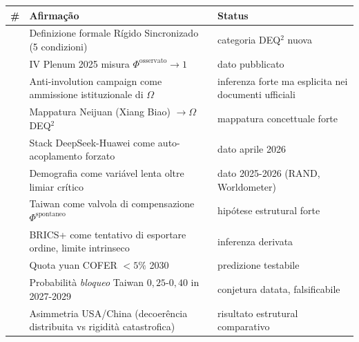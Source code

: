 {\def\LTcaptype{none} %
{\small\begin{longtable}[]{@{}
  >{\raggedright\arraybackslash}p{}
  >{\raggedright\arraybackslash}p{}
  >{\raggedright\arraybackslash}p{}@{}}
\toprule\noalign{}
\begin{minipage}[b]{\linewidth}\raggedright
\#
\end{minipage} & \begin{minipage}[b]{\linewidth}\raggedright
Afirmação
\end{minipage} & \begin{minipage}[b]{\linewidth}\raggedright
Status
\end{minipage} \\
\midrule\noalign{}
\endhead
\bottomrule\noalign{}
\endlastfoot
1 & Definizione formale Rígido Sincronizado (5 condizioni) & \Hypoth{}
categoria DEQ$^2$ nuova \\
2 & IV Plenum 2025 misura \(\Phi^{\text{osservato}} \to 1\) & \Proved{}
dato pubblicato \\
3 & Anti-involution campaign come ammissione istituzionale di \(\Omega\)
& \Hypoth{} inferenza forte ma esplicita nei documenti ufficiali \\
4 & Mappatura Neijuan (Xiang Biao) \(\to \Omega\) DEQ$^2$ & \Hypoth{}
mappatura concettuale forte \\
5 & Stack DeepSeek-Huawei come auto-acoplamento forzato & \Proved{}
dato aprile 2026 \\
6 & Demografia come variável lenta oltre limiar crítico & \Proved{}
dato 2025-2026 (RAND, Worldometer) \\
7 & Taiwan come valvola di compensazione \(\Phi^{\text{spontaneo}}\) &
\Conj{} hipótese estrutural forte \\
8 & BRICS+ come tentativo di esportare ordine, limite intrinseco &
\Hypoth{} inferenza derivata \\
9 & Quota yuan COFER \(< 5\%\) 2030 & \Conj{} predizione testabile \\
10 & Probabilità \emph{bloqueo} Taiwan \(0{,}25\)-\(0{,}40\) in
2027-2029 & \Conj{} conjetura datata, falsificabile \\
11 & Asimmetria USA/China (decoerência distribuita vs rigidità
catastrofica) & \Hypoth{} risultato estrutural comparativo \\
\end{longtable}}
}



